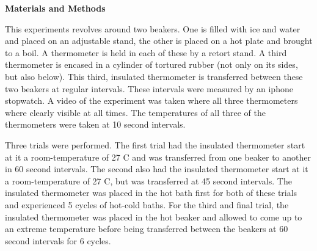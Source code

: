 \documentclass[11pt]{article}
\begin{document}
\begin{multicols}{2}
    \vspace{20pt}

     \selectfont \textbf{Materials and Methods}
    
     \selectfont 


    This experiments revolves around two beakers. One is filled with ice and water and placed on an adjustable stand, the other is placed on a hot plate and brought to a boil. A thermometer is held in each of these by a retort stand. A third thermometer is encased in a cylinder of tortured rubber (not only on its sides, but also below). This third, insulated thermometer is transferred between these two beakers at regular intervals. These intervals were measured by an iphone stopwatch. A video of the experiment was taken where all three thermometers where clearly visible at all times. The temperatures of all three of the thermometers were taken at 10 second intervals.

    Three trials were performed. The first trial had the insulated thermometer start at it a room-temperature of 27 \textdegree C and was transferred from one beaker to another in 60 second intervals. The second also had the insulated thermometer start at it a room-temperature of 27 \textdegree C, but was transferred at 45 second intervals. The insulated thermometer was placed in the hot bath first for both of these trials and experienced 5 cycles of hot-cold baths. For the third and final trial, the insulated thermometer was placed in the hot beaker and allowed to come up to an extreme temperature before being transferred between the beakers at 60 second intervals for 6 cycles.










\end{multicols}
\end{document}
